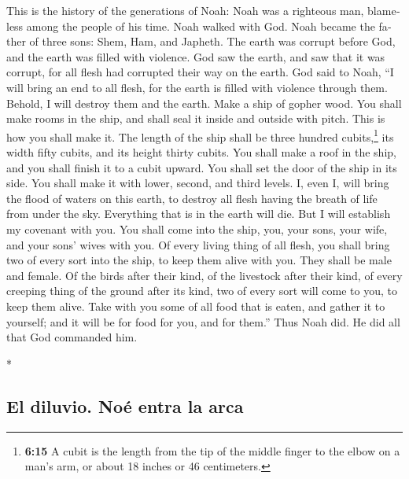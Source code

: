 \begin{paracol}{2}
\begin{otherlanguage}{english}
 This is the history of the generations of Noah: Noah was
a righteous man, blameless among the people of his time. Noah walked
with God.  Noah became the father of three sons: Shem,
Ham, and Japheth.  The earth was corrupt before God, and
the earth was filled with violence.  God saw the earth,
and saw that it was corrupt, for all flesh had corrupted their way on
the earth.  God said to Noah, ``I will bring an end to
all flesh, for the earth is filled with violence through them. Behold, I
will destroy them and the earth.  Make a ship of gopher
wood. You shall make rooms in the ship, and shall seal it inside and
outside with pitch.  This is how you shall make it. The
length of the ship shall be three hundred cubits,\footnote{\textbf{6:15}
  A cubit is the length from the tip of the middle finger to the elbow
  on a man's arm, or about 18 inches or 46 centimeters.} its width fifty
cubits, and its height thirty cubits.  You shall make a
roof in the ship, and you shall finish it to a cubit upward. You shall
set the door of the ship in its side. You shall make it with lower,
second, and third levels.  I, even I, will bring the
flood of waters on this earth, to destroy all flesh having the breath of
life from under the sky. Everything that is in the earth will die.
 But I will establish my covenant with you. You shall
come into the ship, you, your sons, your wife, and your sons' wives with
you.  Of every living thing of all flesh, you shall bring
two of every sort into the ship, to keep them alive with you. They shall
be male and female.  Of the birds after their kind, of
the livestock after their kind, of every creeping thing of the ground
after its kind, two of every sort will come to you, to keep them alive.
 Take with you some of all food that is eaten, and gather
it to yourself; and it will be for food for you, and for them.''
 Thus Noah did. He did all that God commanded him.

\end{otherlanguage}

\switchcolumn[0]*

\hypertarget{el-diluvio.-nouxe9-entra-la-arca}{%
\subsection{El diluvio. Noé entra la
arca}\label{el-diluvio.-nouxe9-entra-la-arca}}


\end{paracol}
